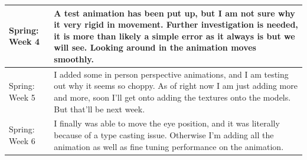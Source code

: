 \documentclass[onecolumn, draftclsnofoot,10pt, compsoc]{IEEEtran}
\begin{document}
\begin{longtable} {|p{1.5cm}|p{13.5cm}|}
Spring: Week 4 &
A test animation has been put up, but I am not sure why it very rigid in movement. Further investigation is needed, it is more than likely a simple error as it always is but we will see. Looking around in the animation moves smoothly. \\ \hline

Spring: Week 5 &
I added some in person perspective animations, and I am testing out why it seems so choppy. As of right now I am just adding more and more, soon I’ll get onto adding the textures onto the models. But that’ll be next week. \\ \hline

Spring: Week 6 &
I finally was able to move the eye position, and it was literally because of a type casting issue. Otherwise I’m adding all the animation as well as fine tuning performance on the animation.  \\ \hline

\end{longtable}
\end{document}
